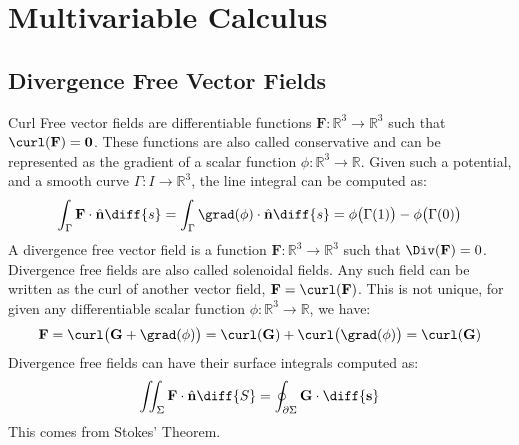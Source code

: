 \chapter{Multivariable Calculus}
    \section{Divergence Free Vector Fields}
        Curl Free vector fields are differentiable functions
        $\mathbf{F}:\mathbb{R}^{3}\rightarrow\mathbb{R}^{3}$ such
        that $\curl(\mathbf{F})=\mathbf{0}$. These functions are
        also called conservative and can be represented as the
        gradient of a scalar function
        $\phi:\mathbb{R}^{3}\rightarrow\mathbb{R}$. Given such a
        potential, and a smooth curve
        $\Gamma:I\rightarrow\mathbb{R}^{3}$, the line integral
        can be computed as:
        \begin{equation}
            \int_{\Gamma}\mathbf{F}\cdot\hat{\mathbf{n}}\diff{s}
            =\int_{\Gamma}\grad(\phi)\cdot\hat{\mathbf{n}}\diff{s}
            =\phi\big(\Gamma(1)\big)-\phi\big(\Gamma(0)\big)
        \end{equation}
        A divergence free vector field is a function
        $\mathbf{F}:\mathbb{R}^{3}\rightarrow\mathbb{R}^{3}$ such
        that $\Div(\mathbf{F})=0$. Divergence free fields are also
        called solenoidal fields. Any such field can be written
        as the curl of another vector field,
        $\mathbf{F}=\curl(\mathbf{F})$. This is not unique, for given
        any differentiable scalar function
        $\phi:\mathbb{R}^{3}\rightarrow\mathbb{R}$, we have:
        \begin{equation}
            \mathbf{F}=\curl\big(\mathbf{G}+\grad(\phi)\big)
                =\curl(\mathbf{G})+\curl\big(\grad(\phi)\big)
                =\curl(\mathbf{G})
        \end{equation}
        Divergence free fields can have their surface integrals
        computed as:
        \begin{equation}
            \iint_{\Sigma}\mathbf{F}\cdot\hat{\mathbf{n}}\diff{S}=
            \oint_{\partial\Sigma}\mathbf{G}\cdot\mathbf{\diff{s}}
        \end{equation}
        This comes from Stokes' Theorem.

